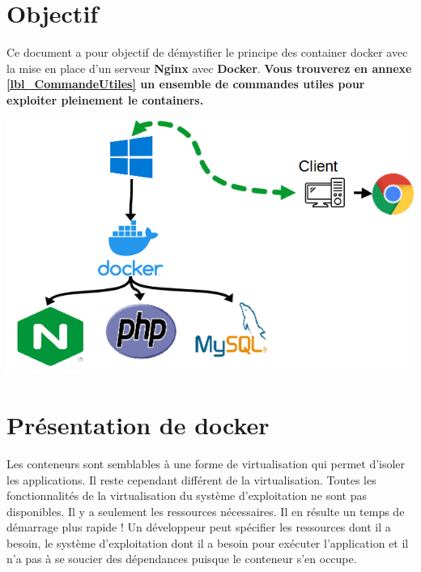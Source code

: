 \documentclass[french, 12pt]{article}%
\begin{document}
\vspace{0.25cm}


\section{Objectif }

Ce document a pour objectif de démystifier le principe des container docker avec la mise en place d'un serveur \textbf{Nginx} avec \textbf{Docker}. 
\textbf{Vous trouverez en annexe \ref{lbl_CommandeUtiles} un ensemble de commandes utiles pour exploiter pleinement le containers.}

\begin{center}
\includegraphics[scale=0.7]{./ressource/schema_docker}
\end{center}



\section{Présentation de docker}

Les conteneurs sont semblables à une forme de virtualisation qui permet d'isoler les applications. Il reste cependant différent de la virtualisation.
Toutes les fonctionnalités de la virtualisation du système d'exploitation ne sont pas disponibles. Il y a seulement les ressources nécessaires. Il en résulte un temps de démarrage plus rapide ! 
Un développeur peut spécifier les ressources dont il a besoin, le système d'exploitation dont il a besoin pour exécuter l'application et il n'a pas à se soucier des dépendances puisque le conteneur s'en occupe.
\end{document}

